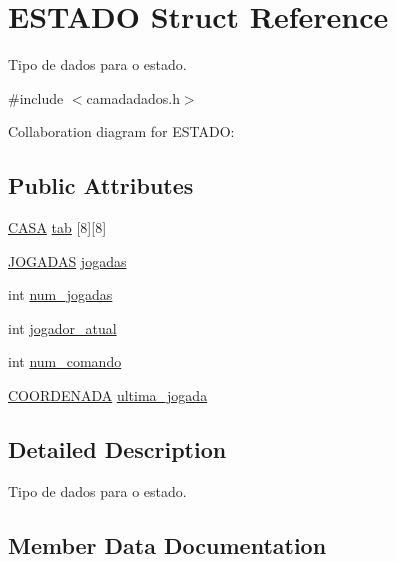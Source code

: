 \hypertarget{structESTADO}{}\section{E\+S\+T\+A\+DO Struct Reference}
\label{structESTADO}


Tipo de dados para o estado.  




{\ttfamily \#include $<$camadadados.\+h$>$}



Collaboration diagram for E\+S\+T\+A\+DO\+:
\subsection*{Public Attributes}
\begin{DoxyCompactItemize}
\item 
\hyperlink{camadadados_8h_aba91601f16d4c485b2d9b8c429f27039}{C\+A\+SA} \hyperlink{structESTADO_ab56f0f1be16954d3768b4174d14c087d}{tab} \mbox{[}8\mbox{]}\mbox{[}8\mbox{]}
\item 
\hyperlink{camadadados_8h_a94c221d29a1760f008b7834093259b7d}{J\+O\+G\+A\+D\+AS} \hyperlink{structESTADO_afae43b87a488fad0f2b56a18bad31d18}{jogadas}
\item 
int \hyperlink{structESTADO_a261495728744647e618b4e623f5a4b7a}{num\+\_\+jogadas}
\item 
int \hyperlink{structESTADO_a5dd28e2e68b7aef2b6b7ea88e02eff58}{jogador\+\_\+atual}
\item 
int \hyperlink{structESTADO_adf1064dfc09145b6995a7897249f1674}{num\+\_\+comando}
\item 
\hyperlink{structCOORDENADA}{C\+O\+O\+R\+D\+E\+N\+A\+DA} \hyperlink{structESTADO_a4896a5c5c1f40b43fb795623327e3f47}{ultima\+\_\+jogada}
\end{DoxyCompactItemize}


\subsection{Detailed Description}
Tipo de dados para o estado. 

\subsection{Member Data Documentation}
\mbox{\label{structESTADO_afae43b87a488fad0f2b56a18bad31d18}} 
